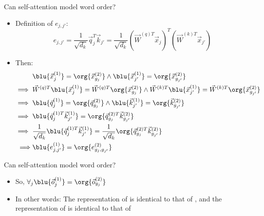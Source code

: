 \documentclass[11pt,compress,t,notes=noshow, xcolor=table]{beamer}
\begin{document}

\begin{vbframe}{Can self-attention model word order?}

\vfill

\begin{itemize}
\item Definition of $e_{j,j'}$:
$$e_{j,j'} = \frac{1}{\sqrt{d_k}} \vec q_{j}^T \vec k_{j'} = \frac{1}{\sqrt{d_k}} (\vec W^{(q)T} \vec x_{j})^T (\vec W^{(k)T} \vec x_{j'})$$
\item Then:
$$
\begin{aligned}
& \blu{\vec x^{(1)}_j} = \org{\vec x^{(2)}_{g_j}} \land \blu{\vec x^{(1)}_{j'}} = \org{\vec x^{(2)}_{g_{j'}}} \\
\implies{} & \vec W^{(q)T} \blu{\vec x^{(1)}_j} = \vec W^{(q)T} \org{\vec x^{(2)}_{g_j}} \land \vec W^{(k)T} \blu{\vec x^{(1)}_{j'}} = \vec W^{(k)T} \org{\vec x^{(2)}_{g_{j'}}} \\
\implies{} & \blu{\vec q^{(1)}_j} = \org{\vec q^{(2)}_{g_j}} \land \blu{\vec k^{(1)}_{j'}} = \org{\vec k^{(2)}_{g_{j'}}} \\
\implies{} & \blu{\vec q^{(1)T}_j \vec k^{(1)}_{j'}} = \org{\vec q^{(2)T}_{g_j} \vec k^{(2)}_{g_{j'}}} \\
\implies{} & \frac{1}{\sqrt{d_k}} \blu{\vec q^{(1)T}_j \vec k^{(1)}_{j'}} =  \frac{1}{\sqrt{d_k}}  \org{\vec q^{(2)T}_{g_j} \vec k^{(2)}_{g_{j'}}} \\
\implies & \blu{e^{(1)}_{j,j'}} = \org{e^{(2)}_{g_j, g_{j'}}}
\end{aligned}
$$
\end{itemize}

\vfill

\end{vbframe}


\begin{vbframe}{Can self-attention model word order?}

\vfill

\begin{itemize}
\item So, $\forall_j \blu{\vec o^{(1)}_j} = \org{\vec o^{(2)}_{g_j}}$
\item In other words: The representation of  is identical to that of , and the representation of  is identical to that of 
\end{itemize}

\vfill

\end{vbframe}
\end{document}
